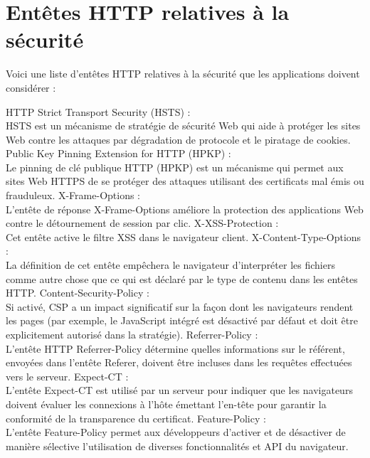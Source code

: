 \section{Entêtes HTTP relatives à la sécurité}
Voici une liste d'entêtes HTTP relatives à la sécurité que les applications doivent considérer :
\begin{itemize}
	\itemcheck HTTP Strict Transport Security (HSTS) : \\
	HSTS est un mécanisme de stratégie de sécurité Web qui aide à protéger les sites Web contre les attaques par dégradation de protocole et le piratage de cookies.
	\itemcheck Public Key Pinning Extension for HTTP (HPKP) : \\
	Le pinning de clé publique HTTP (HPKP) est un mécanisme qui permet aux sites Web HTTPS de se protéger des attaques utilisant des certificats mal émis ou frauduleux.
	\itemcheck X-Frame-Options : \\
	L'entête de réponse X-Frame-Options améliore la protection des applications Web contre le détournement de session par clic.
	\itemcheck X-XSS-Protection : \\
	Cet entête active le filtre XSS dans le navigateur client.
	\itemcheck X-Content-Type-Options : \\
	La définition de cet entête empêchera le navigateur d'interpréter les fichiers comme autre chose que ce qui est déclaré par le type de contenu dans les entêtes HTTP.
	\itemcheck Content-Security-Policy : \\
	Si activé, CSP a un impact significatif sur la façon dont les navigateurs rendent les pages (par exemple, le JavaScript intégré est désactivé par défaut et doit être explicitement autorisé dans la stratégie).
	\itemcheck Referrer-Policy : \\
	L'entête HTTP Referrer-Policy détermine quelles informations sur le référent, envoyées dans l'entête Referer, doivent être incluses dans les requêtes effectuées vers le serveur.
	\itemcheck Expect-CT : \\
	L'entête Expect-CT est utilisé par un serveur pour indiquer que les navigateurs doivent évaluer les connexions à l'hôte émettant l'en-tête pour garantir la conformité de la transparence du certificat.
	\itemcheck Feature-Policy : \\
	L’entête Feature-Policy permet aux développeurs d’activer et de désactiver de manière sélective l’utilisation de diverses fonctionnalités et API du navigateur.
\end{itemize}

